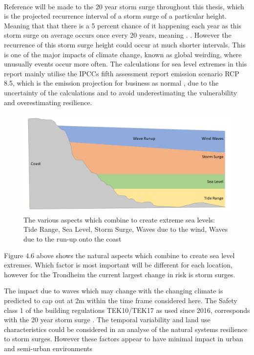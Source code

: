\paragraph{}

Reference will be made to the 20 year storm surge throughout this thesis, which is the projected recurrence interval of a storm surge of a particular height. Meaning that that there is a 5 percent chance of it happening each year as this storm surge on average occurs once every 20 years, meaning \cite{hanssen_saksframlegg_2013}. . However the recurrence of this storm surge height could occur at much shorter intervals. This is one of the major impacts of climate change, known as global weirding, where unusually events occur more often. The calculations for sea level extremes in this report mainly utilise the IPCCs fifth assessment report emission scenario RCP 8.5, which is the emission projection for business as normal \cite{hanssen-bauer_climate_2017}, due to the uncertainty of the calculations and to avoid underestimating the vulnerability and overestimating resilience.  




\begin{figure}[h!]
    \centering
    \includegraphics[width=1\textwidth]{fig_theory/sea level extremes.png}
    \caption{The various aspects which combine to create extreme sea levels: Tide Range, Sea Level, Storm Surge, Waves due to the wind, Waves due to the run-up onto the coast}
    \label{fig:my_label}
\end{figure}

Figure 4.6 above shows the natural aspects which combine to create sea level extremes. Which factor is most important will be different for each location, however for the Trondheim the current largest change in risk is storm surges. 

The impact due to waves which may change with the changing climate is predicted to cap out at 2m within the time frame considered here. The Safety class 1 of the building regulations TEK10/TEK17 as used since 2016, corresponds with the 20 year storm surge \cite{tides_high_2022}. The temporal variability and land use characteristics could be considered in an analyse of the natural systems resilience to storm surges. However these factors appear to have minimal impact in urban and semi-urban environments \cite{hoffken_effects_2020}

